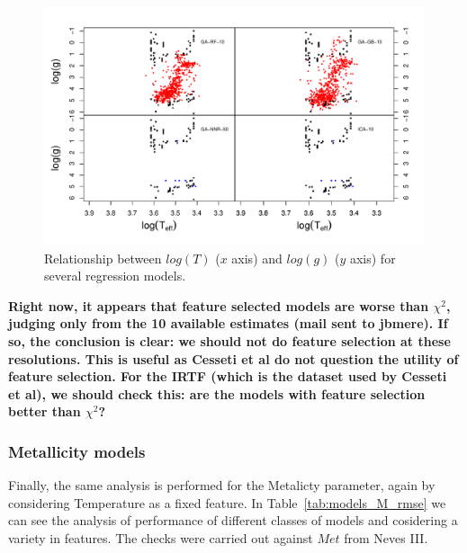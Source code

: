 \begin{figure}
 \begin{center}
 \includegraphics[width=12cm]{figs/ipac-teff-logg.pdf}
 \caption{Relationship between $log(T) $ ($x$ axis) 
 and $log(g)$ ($y$ axis) for several regression models.}
 \label{fig:teffvsloggIPAC}
 \end{center}
\end{figure}

{\bf Right now, it appears that feature selected models are worse than $\chi^2$, judging only from the 10 available estimates (mail sent to jbmere). If so, the conclusion is clear: we should not do feature selection at these resolutions. This is useful as Cesseti et al do not question the utility of feature selection. For the IRTF (which is the dataset used by Cesseti et al), we should check this: are the models with feature selection better than $\chi^2$?}

\subsubsection{Metallicity models} 

Finally, the same analysis is performed for the Metalicty parameter, 
again by considering Temperature as a fixed feature.
In Table~\ref{tab:models_M_rmse} 
we can see the analysis of performance of different classes of
models and cosidering a variety in features. The checks were carried out against 
$Met$ from Neves III.


